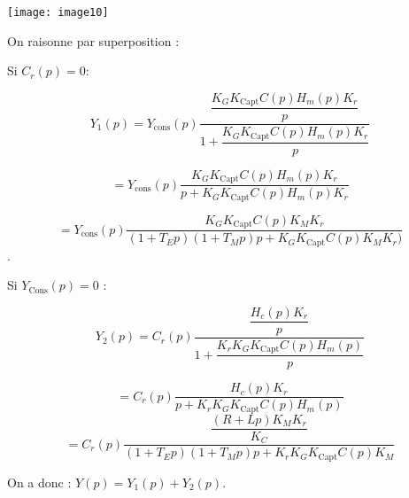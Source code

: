 \begin{center}
\texttt{[image: image10]}
\end{center} 



\fi

\ifprof
\begin{corrige}
On raisonne par superposition :

Si $C_r (p)=0$: 

$$Y_1 (p)
=Y_{\text{cons}}(p) \dfrac{\dfrac{K_G K_{\text{Capt}} C(p) H_m (p) K_r}{p}}{1+\dfrac{K_G K_{\text{Capt}} C(p) H_m (p) K_r}{p}}$$

$$
=Y_{\text{cons}} (p) \dfrac{K_G K_{\text{Capt}} C(p) H_m (p) K_r}{p+K_G K_{\text{Capt}} C(p) H_m (p) K_r } 
$$

$$
=Y_{\text{cons}} (p) \dfrac{K_G K_{\text{Capt}} C(p) K_M  K_r}{(1+T_E p)(1+T_M p)p+K_G K_{\text{Capt}} C(p) K_M K_r )}$$.

\end{corrige}

\begin{corrige}
Si $Y_{\text{Cons}} (p)=0$ :

$$Y_2 (p)
=C_r (p) \dfrac{\dfrac{H_c (p) K_r}{p}}{1+\dfrac{K_r K_G K_{\text{Capt}} C(p) H_m (p)}{p} }$$

$$
=C_r (p) \dfrac{H_c (p) K_r}{p+K_r K_G K_{\text{Capt}} C(p) H_m (p) }$$
$$
=C_r (p) \dfrac{\dfrac{(R+Lp) K_M  K_r}{K_C }}{(1+T_E p)(1+T_M p)p+K_r K_G K_{\text{Capt}} C(p) K_M }$$

On a donc :
$Y(p)=Y_1 (p)+Y_2 (p)$.

\end{corrige}
\else
\fi

\ifprof
\begin{corrige}
\end{corrige}
\else
\fi

\ifprof
\begin{corrige}
\end{corrige}
\else
\fi

\ifprof
\begin{corrige}
\end{corrige}
\else
\fi

